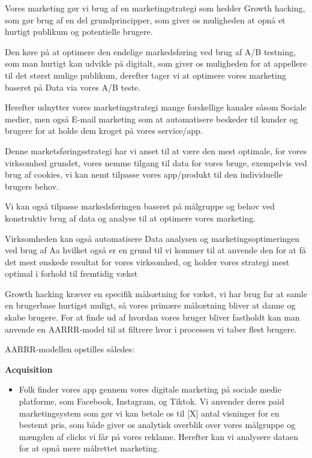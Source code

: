 Vores marketing gør vi brug af en marketingstrategi som hedder Growth hacking, som gør brug af en del grundprincipper, som giver os muligheden at opnå et hurtigt publikum og potentielle brugere. 

Den køre på at optimere den endelige markedsføring ved brug af A/B testning, som man hurtigt kan udvikle på digitalt, som giver os muligheden for at appellere til det størst mulige publikum, derefter tager vi at optimere vores marketing baseret på Data via vores A/B teste. 

Herefter udnytter vores marketingstrategi mange forskellige kanaler såsom Sociale medier, men også E-mail marketing som at automatisere beskeder til kunder og brugere for at holde dem kroget på vores service/app. 

Denne marketsføringsstrategi har vi anset til at være den mest optimale, for vores virksomhed grundet, vores nemme tilgang til data for vores bruge, exempelvis ved brug af cookies, vi kan nemt tilpasse vores app/produkt til den individuelle brugers behov. 

Vi kan også tilpasse markedsføringen baseret på målgruppe og behov ved konstruktiv brug af data og analyse til at optimere vores marketing. 

Virksomheden kan også automatisere Data analysen og marketingsoptimeringen ved brug af Aa hvilket også er en grund til vi kommer til at anvende den for at få det mest ønskede resultat for vores virksomhed, og holder vores strategi mest optimal i forhold til fremtidig vækst 

Growth hacking kræver en specifik målsætning for vækst, vi har brug far at samle en brugerbase hurtigst muligt, så vores primære målsætning bliver at danne og skabe brugere. For at finde ud af hvordan vores bruger bliver fastholdt kan man anvende en AARRR-model til at filtrere hvor i processen vi taber flest brugere. 

AARRR-modellen opstilles således:

\textbf{Acquisition}
\begin{itemize}
    \item Folk finder vores app gennem vores digitale marketing på sociale medie platforme, som Facebook, Instagram, og Tiktok. Vi anvender deres paid marketingsystem som gør vi kan betale os til [X] antal visninger for en bestemt pris, som både giver os analytisk overblik over vores målgruppe og mængden af clicks vi får på vores reklame. Herefter kan vi analysere dataen for at opnå mere målrettet marketing.
\end{itemize}

